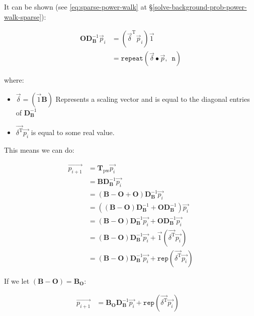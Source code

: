 \documentclass[11pt, twoside]{report}
\begin{document}
It can be shown (see \eqref{eq:sparse-power-walk} at \S \ref{solve-background-prob-power-walk-sparse}):

\begin{align}
	\mathbf{O} \mathbf{D}_{\mathbf{B}}^{- 1} \vec{p}_{i} &= \left( \vec{\delta}^{\mathrm{T}} \vec{p}_{i} \right) \vec{1} \label{eq:to-prove-back} \\
	&=    \mathtt{repeat} \left(  \vec{\delta} \bullet \vec{p}, \enspace \mathtt{n}  \right)
\end{align}




where:

\begin{itemize}
  \item \(\vec{\delta}=\left(\vec{1}\mathbf{B}\right)\) Represents a scaling vector and is equal to the diagonal entries of \(\mathbf{D}_{\mathbf{B}}^{-1}\)
    \item {\(\vec{\delta^{\mathrm{T}}} \vec{p_{i}}\)} is equal to some real value.
\end{itemize}

This means we can do:

\begin{align}
  \overrightarrow{p_{i + 1}} & = \mathbf{T}_{\mathrm{pw}}
  \overrightarrow{p_i}\\
& = \mathbf{BD}_{\mathbf{B}}^{- 1}
  \overrightarrow{p_i}\\
  & = \left( \mathbf{B} - \mathbf{O} + \mathbf{O} \right)
  \mathbf{D}_{\mathbf{B}}^{- 1} \overrightarrow{p_i}\\
  & = \left( \left( \mathbf{B} - \mathbf{O} \right)
  \mathbf{D}_{\mathbf{B}}^{- 1} + \mathbf{OD}_{\mathbf{B}}^{- 1} \right)
  \overrightarrow{p_i}\\
  & = \left( \mathbf{B} - \mathbf{O} \right) \mathbf{D}_{\mathbf{B}}^{- 1}
  \overrightarrow{p_i} + \mathbf{OD}_{\mathbf{B}}^{- 1} \overrightarrow{p_i}\\
  & = \left( \mathbf{B} - \mathbf{O} \right) \mathbf{D}_{\mathbf{B}}^{- 1}
  \overrightarrow{p_i} + \vec{1} (\overrightarrow{\delta^{\mathrm{T}}}
  \overrightarrow{p_i}) \\
  & = \left( \mathbf{B} - \mathbf{O} \right) \mathbf{D}_{\mathbf{B}}^{- 1}
  \overrightarrow{p_i} + \mathtt{rep} (\overrightarrow{\delta^{\mathrm{T}}}
  \overrightarrow{p_i})
\end{align}

If we let \((\mathbf{B}-\mathbf{O}) = \mathbf{B_{\mathbf{O}}}\):

\begin{eqnarray*}
  \overrightarrow{p_{i + 1}} & = \mathbf{B_{\mathbf{O}}} \mathbf{D}_{\mathbf{B}}^{- 1}
  \overrightarrow{p_i} + \mathtt{rep} (\overrightarrow{\delta^{\mathrm{T}}}
  \overrightarrow{p_i}) &
\end{eqnarray*}
\end{document}
